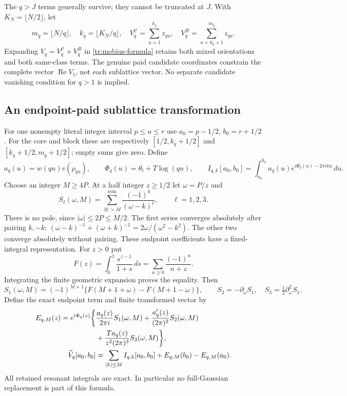 \documentclass[11pt]{article}
\numberwithin{equation}{section}
\theoremstyle{definition}
\theoremstyle{remark}
\begin{document}
The $q>J$ terms generally survive; they cannot be truncated at $J$.
With $K_N=\lfloor N/2\rfloor$, let
\[
 m_q=\lfloor N/q\rfloor,\quad k_q=\lfloor K_N/q\rfloor,\quad
 V_q^{\mathcal C}=\sum_{u=1}^{k_q}z_{qu},\quad
 V_q^{\mathcal B}=\sum_{u=k_q+1}^{m_q}z_{qu}.
\]
Expanding $V_q=V_q^{\mathcal C}+V_q^{\mathcal B}$ in
\eqref{tr:mobius-formula} retains both mixed orientations and both
same-class terms.  The genuine paid candidate coordinates constrain the
complete vector $\operatorname{Re}V_1$, not each sublattice vector.
No separate candidate vanishing condition for $q>1$ is implied.

\subsection{An endpoint-paid sublattice transformation}

For one nonempty literal integer interval $p\le u\le r$ use
$a_0=p-1/2$, $b_0=r+1/2$.  For the core and block these are respectively
$[1/2,k_q+1/2]$ and $[k_q+1/2,m_q+1/2]$; empty sums give zero.
Define
\[
 a_q(u)=w(qu)v(\rho_{qu}),\qquad
 \Phi_q(u)=\theta_t+T\log(qu),\qquad
 I_{q,k}[a_0,b_0]=\int_{a_0}^{b_0}
 a_q(u)e^{i\Phi_q(u)-2\pi iku}\,du.
\]
Choose an integer $M\ge4P$.  At a half integer $z\ge1/2$ let
$\omega=P/z$ and
\[
 S_\ell(\omega,M)=\sum_{|k|>M}^{\mathrm{sym}}
       \frac{(-1)^k}{(\omega-k)^\ell},\qquad \ell=1,2,3.
\]
There is no pole, since $|\omega|\le2P\le M/2$.  The first series
converges absolutely after pairing $k,-k$:
$(\omega-k)^{-1}+(\omega+k)^{-1}=2\omega/(\omega^2-k^2)$.
The other two converge absolutely without pairing.  These endpoint
coefficients have a fixed-integral representation.  For $z>0$ put
\[
 F(z)=\int_0^1\frac{s^{z-1}}{1+s}\,ds
     =\sum_{n\ge0}\frac{(-1)^n}{n+z}.
\]
Integrating the finite geometric expansion proves the equality.  Then
\begin{equation}
\label{tr:tail-functions}
 S_1(\omega,M)=(-1)^{M+1}
 \{F(M+1+\omega)-F(M+1-\omega)\},\qquad
 S_2=-\partial_\omega S_1,\quad S_3=\tfrac12\partial_\omega^2S_1.
\end{equation}
Define the exact endpoint term and finite transformed vector by
\begin{align}
\label{tr:sublattice-endpoint}
 E_{q,M}(z)=e^{i\Phi_q(z)}\bigg\{&
 \frac{a_q(z)}{2\pi i}S_1(\omega,M)
 +\frac{a_q'(z)}{(2\pi)^2}S_2(\omega,M)\notag\\
 &+\frac{T a_q(z)}{z^2(2\pi)^3}S_3(\omega,M)\bigg\},\\
\label{tr:sublattice-main}
 \widetilde V_q[a_0,b_0]&=
 \sum_{|k|\le M}I_{q,k}[a_0,b_0]
 +E_{q,M}(b_0)-E_{q,M}(a_0).
\end{align}
All retained resonant integrals are exact.  In particular no
full-Gaussian replacement is part of this formula.
\end{document}
